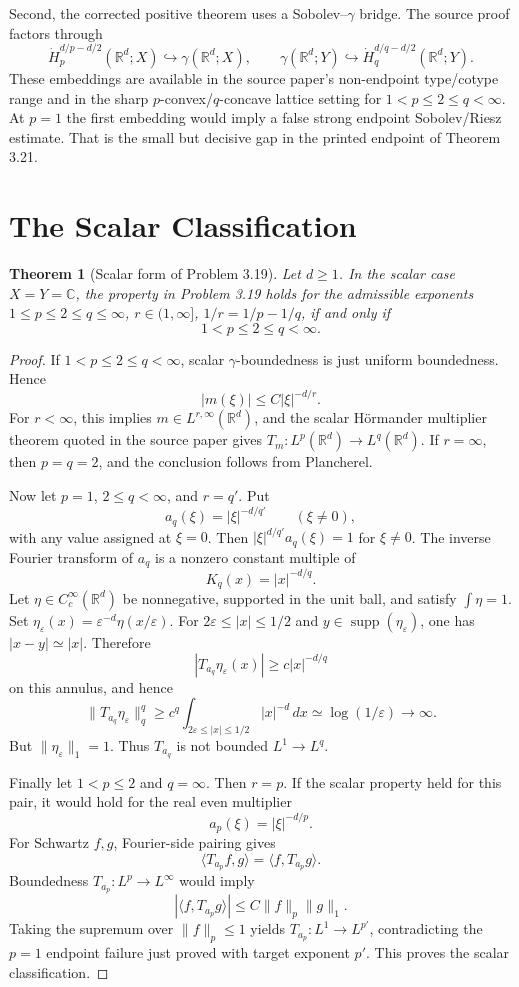 \documentclass[11pt]{article}
\newtheorem{theorem}{Theorem}
\newcommand{\R}{\mathbb R}
\newcommand{\C}{\mathbb C}
\DeclareMathOperator{\supp}{supp}
\begin{document}
Second, the corrected positive theorem uses a Sobolev--\(\gamma\) bridge.  The source proof factors through
\[
  \dot H_p^{d/p-d/2}(\R^d;X)\hookrightarrow\gamma(\R^d;X),
  \qquad
  \gamma(\R^d;Y)\hookrightarrow \dot H_q^{d/q-d/2}(\R^d;Y).
\]
These embeddings are available in the source paper's non-endpoint type/cotype range and in the sharp \(p\)-convex/\(q\)-concave lattice setting for \(1<p\le2\le q<\infty\).  At \(p=1\) the first embedding would imply a false strong endpoint Sobolev/Riesz estimate.  That is the small but decisive gap in the printed endpoint of Theorem 3.21.

\section*{The Scalar Classification}

\begin{theorem}[Scalar form of Problem 3.19]\label{thm:scalar}
Let \(d\ge1\).  In the scalar case \(X=Y=\C\), the property in Problem 3.19 holds for the admissible exponents \(1\le p\le2\le q\le\infty\), \(r\in(1,\infty]\), \(1/r=1/p-1/q\), if and only if
\[
  1<p\le2\le q<\infty .
\]
\end{theorem}

\begin{proof}
If \(1<p\le2\le q<\infty\), scalar \(\gamma\)-boundedness is just uniform boundedness.  Hence
\[
  |m(\xi)|\le C|\xi|^{-d/r}.
\]
For \(r<\infty\), this implies \(m\in L^{r,\infty}(\R^d)\), and the scalar H\"ormander multiplier theorem quoted in the source paper gives \(T_m:L^p(\R^d)\to L^q(\R^d)\).  If \(r=\infty\), then \(p=q=2\), and the conclusion follows from Plancherel.

Now let \(p=1\), \(2\le q<\infty\), and \(r=q'\).  Put
\[
  a_q(\xi)=|\xi|^{-d/q'}\qquad(\xi\ne0),
\]
with any value assigned at \(\xi=0\).  Then \(|\xi|^{d/q'}a_q(\xi)=1\) for \(\xi\ne0\).  The inverse Fourier transform of \(a_q\) is a nonzero constant multiple of
\[
  K_q(x)=|x|^{-d/q}.
\]
Let \(\eta\in C_c^\infty(\R^d)\) be nonnegative, supported in the unit ball, and satisfy \(\int\eta=1\).  Set \(\eta_\varepsilon(x)=\varepsilon^{-d}\eta(x/\varepsilon)\).  For \(2\varepsilon\le |x|\le1/2\) and \(y\in\supp(\eta_\varepsilon)\), one has \(|x-y|\simeq |x|\).  Therefore
\[
  |T_{a_q}\eta_\varepsilon(x)|\ge c|x|^{-d/q}
\]
on this annulus, and hence
\[
  \|T_{a_q}\eta_\varepsilon\|_q^q
  \ge c^q\int_{2\varepsilon\le |x|\le1/2}|x|^{-d}\,dx
  \simeq \log(1/\varepsilon)\to\infty .
\]
But \(\|\eta_\varepsilon\|_1=1\).  Thus \(T_{a_q}\) is not bounded \(L^1\to L^q\).

Finally let \(1<p\le2\) and \(q=\infty\).  Then \(r=p\).  If the scalar property held for this pair, it would hold for the real even multiplier
\[
  a_p(\xi)=|\xi|^{-d/p}.
\]
For Schwartz \(f,g\), Fourier-side pairing gives
\[
  \langle T_{a_p}f,g\rangle=\langle f,T_{a_p}g\rangle .
\]
Boundedness \(T_{a_p}:L^p\to L^\infty\) would imply
\[
  |\langle f,T_{a_p}g\rangle|
  \le C\|f\|_p\|g\|_1 .
\]
Taking the supremum over \(\|f\|_p\le1\) yields \(T_{a_p}:L^1\to L^{p'}\), contradicting the \(p=1\) endpoint failure just proved with target exponent \(p'\).  This proves the scalar classification.
\end{proof}
\end{document}
